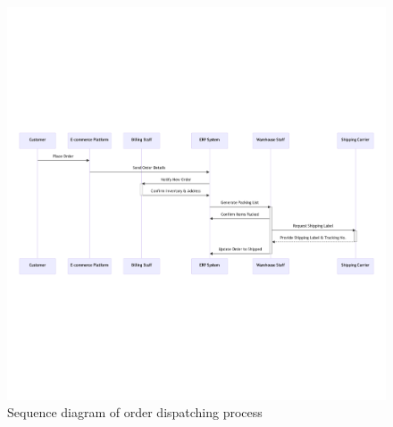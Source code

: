 \begin{figure}[p]\centering
\includegraphics[width=140mm]{img/chap02/fig_proces_sequence_diagram.png}
\caption{Sequence diagram of order dispatching process}
\label{img02:order-dispatch-process}
\end{figure}






